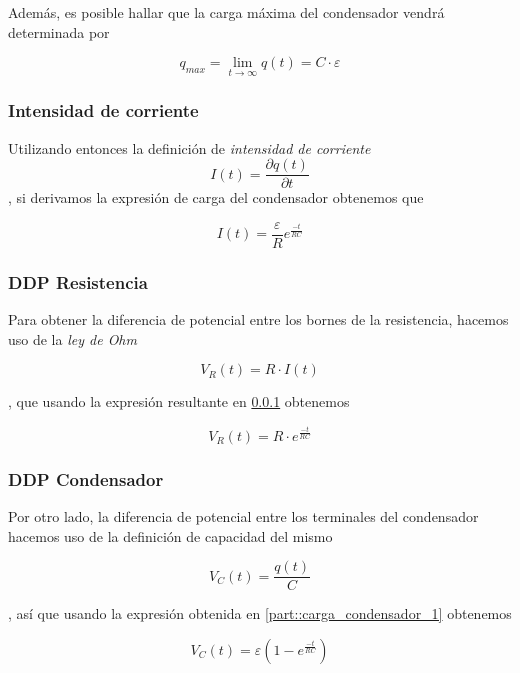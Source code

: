 \documentclass[../main.tex]{subfiles}
\begin{document}
Además, es posible hallar que la carga máxima del condensador vendrá determinada por 

$$q_{max} = \lim_{t \to \infty} q(t) = C \cdot \varepsilon$$

\subsubsection{Intensidad de corriente}
\label{part::carga_condensador_2}
Utilizando entonces la definición de \textit{intensidad de corriente}
$$I(t) = \frac{\partial q(t)}{ \partial t}$$, si derivamos la expresión de carga del condensador obtenemos que

\begin{equation}
    I(t) = \frac{\varepsilon}{R} e^{\frac{-t}{RC}}
\end{equation}

\subsubsection{DDP Resistencia}
\label{part::carga_condensador_3}
Para obtener la diferencia de potencial entre los bornes de la resistencia, hacemos uso de la \textit{ley de Ohm}

\begin{equation}
    V_R(t) = R \cdot I(t)
    \label{eqq::dif_potencial_resistencia}
\end{equation}


, que usando la expresión resultante en \ref{part::carga_condensador_2} obtenemos

\begin{equation}
    V_R(t) = R \cdot e^{\frac{-t}{RC}}
\end{equation}

\subsubsection{DDP Condensador}
\label{part::carga_condensador_4}
Por otro lado, la diferencia de potencial entre los terminales del condensador hacemos uso de la definición de capacidad del mismo 

\begin{equation}
    V_C(t) = \frac{q(t)}{C}
    \label{eqq::dif_potencial_condensador}
\end{equation}

, así que usando la expresión obtenida en \ref{part::carga_condensador_1} obtenemos

\begin{equation}
    V_C(t) = \varepsilon \left( 1- e^{\frac{-t}{RC}}\right)
\end{equation}
\end{document}
